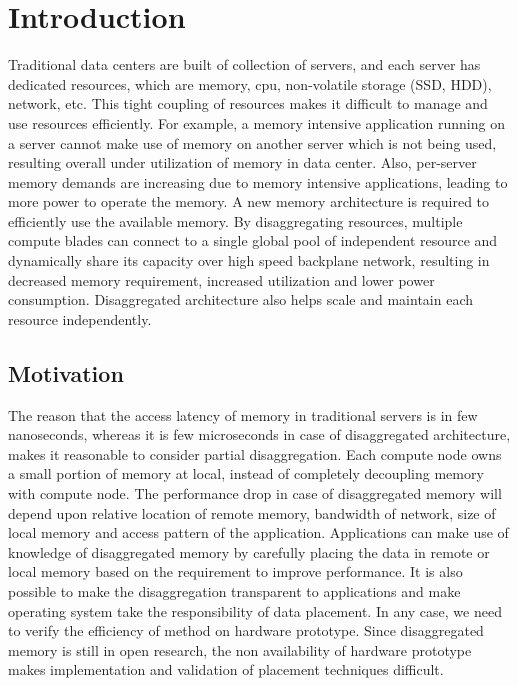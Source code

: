 
\newcommand{\etas}{\ensuremath{\eta_{\mathrm{s}}}}


\chapter{Introduction}

Traditional data centers are built of collection of servers, and each server has dedicated resources, which are memory, cpu, non-volatile storage (SSD, HDD), network, etc. This tight coupling of resources makes it difficult to manage and use resources efficiently. For example, a memory intensive application running on a server cannot make use of memory on another server which is not being used, resulting overall under utilization of memory in data center. Also, per-server memory demands are increasing due to memory intensive applications, leading to more power to operate the memory. A new memory architecture is required to efficiently use the available memory. By disaggregating resources, multiple compute blades can connect to a single global pool of independent resource and dynamically share its capacity over high speed backplane network, resulting in decreased memory requirement, increased utilization and lower power consumption. Disaggregated architecture also helps scale and maintain each resource independently.

\section{Motivation}
The reason that the access latency of memory in traditional servers is in few nanoseconds, whereas it is few microseconds in case of disaggregated architecture, makes it reasonable to consider partial disaggregation. Each compute node owns a small portion of memory at local, instead of completely decoupling memory with compute node. The performance drop in case of disaggregated memory will depend upon relative location of remote memory, bandwidth of network, size of local memory and access pattern of the application. Applications can make use of knowledge of disaggregated memory by carefully placing the data in remote or local memory based on the requirement to improve performance. It is also possible to make the disaggregation transparent to applications and make operating system take the responsibility of data placement. In any case, we need to verify the efficiency of method on hardware prototype. Since disaggregated memory is still in open research, the non availability of hardware prototype makes implementation and validation of placement techniques difficult. 

